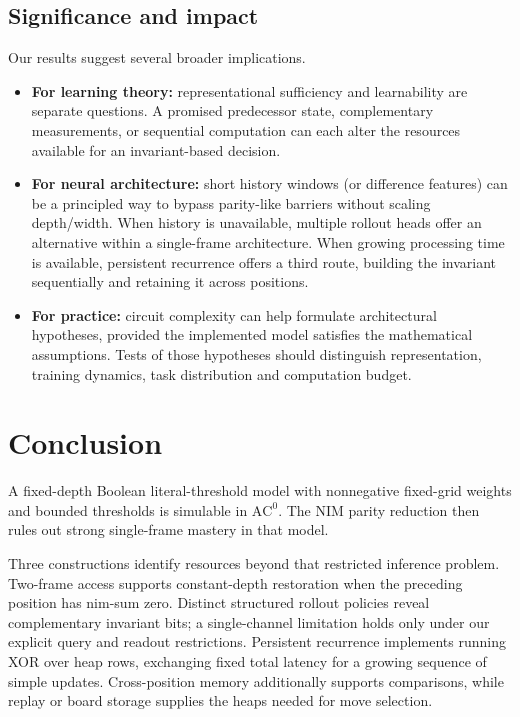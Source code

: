 \documentclass[twoside,11pt]{article}
\newcommand{\AC}{\mathrm{AC}}
\numberwithin{theorem}{section}
\numberwithin{equation}{section}
\begin{document}
\subsection{Significance and impact}
Our results suggest several broader implications.

\begin{itemize}[leftmargin=*]
\item \textbf{For learning theory:} representational sufficiency and learnability are separate questions. A promised predecessor state, complementary measurements, or sequential computation can each alter the resources available for an invariant-based decision.
\item \textbf{For neural architecture:} short history windows (or difference features) can be a principled way to bypass parity-like barriers without scaling depth/width. When history is unavailable, multiple rollout heads offer an alternative within a single-frame architecture. When growing processing time is available, persistent recurrence offers a third route, building the invariant sequentially and retaining it across positions.
\item \textbf{For practice:} circuit complexity can help formulate architectural hypotheses, provided the implemented model satisfies the mathematical assumptions. Tests of those hypotheses should distinguish representation, training dynamics, task distribution and computation budget.
\end{itemize}


\section{Conclusion}
\label{sec:conclusion}
A fixed-depth Boolean literal-threshold model with nonnegative fixed-grid weights and bounded thresholds is simulable in $\AC^0$. The NIM parity reduction then rules out strong single-frame mastery in that model.

Three constructions identify resources beyond that restricted inference problem. Two-frame access supports constant-depth restoration when the preceding position has nim-sum zero. Distinct structured rollout policies reveal complementary invariant bits; a single-channel limitation holds only under our explicit query and readout restrictions. Persistent recurrence implements running XOR over heap rows, exchanging fixed total latency for a growing sequence of simple updates. Cross-position memory additionally supports comparisons, while replay or board storage supplies the heaps needed for move selection.
\end{document}
